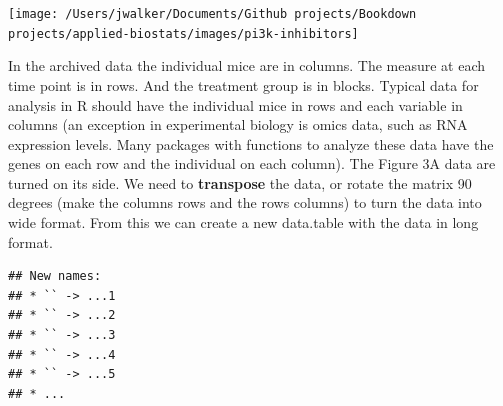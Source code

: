 \documentclass[]{book}
\newenvironment{Shaded}{\begin{snugshade}}{\end{snugshade}}
\newcommand{\DataTypeTok}[1]{\textcolor[rgb]{0.13,0.29,0.53}{#1}}
\newcommand{\KeywordTok}[1]{\textcolor[rgb]{0.13,0.29,0.53}{\textbf{#1}}}
\newcommand{\NormalTok}[1]{#1}
\newcommand{\OperatorTok}[1]{\textcolor[rgb]{0.81,0.36,0.00}{\textbf{#1}}}
\newcommand{\OtherTok}[1]{\textcolor[rgb]{0.56,0.35,0.01}{#1}}
\newcommand{\StringTok}[1]{\textcolor[rgb]{0.31,0.60,0.02}{#1}}
\begin{document}
\texttt{[image: /Users/jwalker/Documents/Github projects/Bookdown projects/applied-biostats/images/pi3k-inhibitors]}

In the archived data the individual mice are in columns. The measure at each time point is in rows. And the treatment group is in blocks. Typical data for analysis in R should have the individual mice in rows and each variable in columns (an exception in experimental biology is omics data, such as RNA expression levels. Many packages with functions to analyze these data have the genes on each row and the individual on each column). The Figure 3A data are turned on its side. We need to \textbf{transpose} the data, or rotate the matrix 90 degrees (make the columns rows and the rows columns) to turn the data into wide format. From this we can create a new data.table with the data in long format.

\begin{Shaded}
\end{Shaded}

\begin{verbatim}
## New names:
## * `` -> ...1
## * `` -> ...2
## * `` -> ...3
## * `` -> ...4
## * `` -> ...5
## * ...
\end{verbatim}
\end{document}
